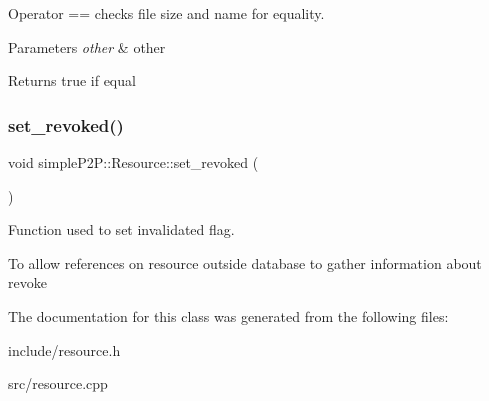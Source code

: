 Operator == checks file size and name for equality. 


\begin{DoxyParams}{Parameters}
{\em other} & other \\
\hline
\end{DoxyParams}
\begin{DoxyReturn}{Returns}
true if equal 
\end{DoxyReturn}
\mbox{\label{classsimpleP2P_1_1Resource_a49e46561e4088f78bb96c07c12d4738c}} 
\subsubsection{\texorpdfstring{set\+\_\+revoked()}{set\_revoked()}}
{\footnotesize\ttfamily void simple\+P2\+P\+::\+Resource\+::set\+\_\+revoked (\begin{DoxyParamCaption}{ }\end{DoxyParamCaption})\hspace{0.3cm}{\ttfamily [inline]}}



Function used to set invalidated flag. 

To allow references on resource outside database to gather information about revoke 

The documentation for this class was generated from the following files\+:\begin{DoxyCompactItemize}
\item 
include/resource.\+h\item 
src/resource.\+cpp\end{DoxyCompactItemize}
